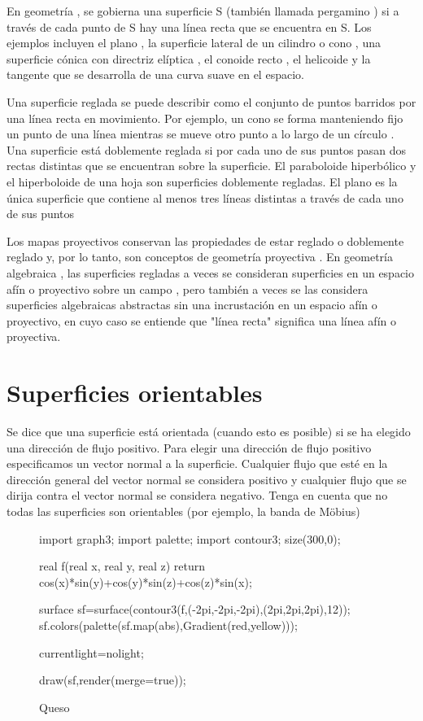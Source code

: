 \documentclass[a4paper]{book}
\begin{document}
 En geometría , se gobierna una superficie S (también llamada pergamino ) si a través de cada punto de S hay una línea recta que se encuentra en S. Los ejemplos incluyen el plano , la superficie lateral de un cilindro o cono , una superficie cónica con directriz elíptica , el conoide recto , el helicoide y la tangente que se desarrolla de una curva suave en el espacio.

 Una superficie reglada se puede describir como el conjunto de puntos barridos por una línea recta en movimiento. Por ejemplo, un cono se forma manteniendo fijo un punto de una línea mientras se mueve otro punto a lo largo de un círculo . Una superficie está doblemente reglada si por cada uno de sus puntos pasan dos rectas distintas que se encuentran sobre la superficie. El paraboloide hiperbólico y el hiperboloide de una hoja son superficies doblemente regladas. El plano es la única superficie que contiene al menos tres líneas distintas a través de cada uno de sus puntos

 Los mapas proyectivos conservan las propiedades de estar reglado o doblemente reglado y, por lo tanto, son conceptos de geometría proyectiva . En geometría algebraica , las superficies regladas a veces se consideran superficies en un espacio afín o proyectivo sobre un campo , pero también a veces se las considera superficies algebraicas abstractas sin una incrustación en un espacio afín o proyectivo, en cuyo caso se entiende que "línea recta" significa una línea afín o proyectiva.

\section{Superficies orientables}


Se dice que una superficie está orientada (cuando esto es posible) si se ha elegido una dirección de flujo positivo. Para elegir una dirección de flujo positivo especificamos un vector normal a la superficie. Cualquier flujo que esté en la dirección general del vector normal se considera positivo y cualquier flujo que se dirija contra el vector normal se considera negativo. Tenga en cuenta que no todas las superficies son orientables (por ejemplo, la banda de Möbius)

\begin{figure}[!ht]
	\begin{asy}
import graph3;
import palette;
import contour3;
size(300,0);

real f(real x, real y, real z) {
return cos(x)*sin(y)+cos(y)*sin(z)+cos(z)*sin(x);
}

surface sf=surface(contour3(f,(-2pi,-2pi,-2pi),(2pi,2pi,2pi),12));
sf.colors(palette(sf.map(abs),Gradient(red,yellow)));

currentlight=nolight;

draw(sf,render(merge=true));
	\end{asy}
	\caption{Queso}
\end{figure}
\end{document}
